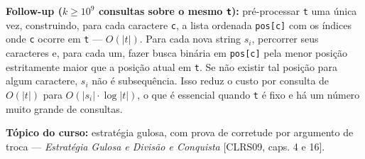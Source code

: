\textbf{Follow-up ($k \geq 10^9$ consultas sobre o mesmo \texttt{t}):}
pré-processar \texttt{t} uma única vez, construindo, para cada caractere
\texttt{c}, a lista ordenada \texttt{pos[c]} com os índices onde \texttt{c}
ocorre em \texttt{t} --- $O(|t|)$. Para cada nova string $s_i$, percorrer seus
caracteres e, para cada um, fazer busca binária em \texttt{pos[c]} pela menor
posição estritamente maior que a posição atual em \texttt{t}. Se não existir
tal posição para algum caractere, $s_i$ não é subsequência. Isso reduz o
custo por consulta de $O(|t|)$ para $O(|s_i| \cdot \log |t|)$, o que é
essencial quando \texttt{t} é fixo e há um número muito grande de consultas.

\textbf{Tópico do curso:} estratégia gulosa, com prova de corretude por
argumento de troca --- \emph{Estratégia Gulosa e Divisão e Conquista}
[CLRS09, caps. 4 e 16].
